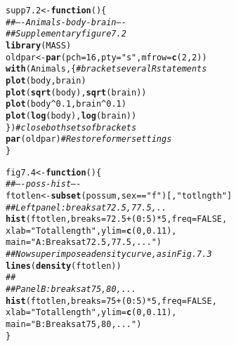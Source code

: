 \documentclass[12pt, a4paper,  BCOR=8.25mm, DIV=15]{scrartcl}\usepackage[]{graphicx}\usepackage[]{color}
\makeatletter
\newcommand{\hlnum}[1]{\textcolor[rgb]{0.686,0.059,0.569}{#1}}%
\newcommand{\hlstr}[1]{\textcolor[rgb]{0.192,0.494,0.8}{#1}}%
\newcommand{\hlcom}[1]{\textcolor[rgb]{0.678,0.584,0.686}{\textit{#1}}}%
\newcommand{\hlopt}[1]{\textcolor[rgb]{0,0,0}{#1}}%
\newcommand{\hlstd}[1]{\textcolor[rgb]{0.345,0.345,0.345}{#1}}%
\newcommand{\hlkwa}[1]{\textcolor[rgb]{0.161,0.373,0.58}{\textbf{#1}}}%
\newcommand{\hlkwb}[1]{\textcolor[rgb]{0.69,0.353,0.396}{#1}}%
\newcommand{\hlkwc}[1]{\textcolor[rgb]{0.333,0.667,0.333}{#1}}%
\newcommand{\hlkwd}[1]{\textcolor[rgb]{0.737,0.353,0.396}{\textbf{#1}}}%
\newenvironment{kframe}{%
 \def\at@end@of@kframe{}%
 \ifinner\ifhmode%
  \def\at@end@of@kframe{\end{minipage}}%
  \begin{minipage}{\columnwidth}%
 \fi\fi%
 \def\FrameCommand##1{\hskip\@totalleftmargin \hskip-\fboxsep
 \colorbox{shadecolor}{##1}\hskip-\fboxsep
     \hskip-\linewidth \hskip-\@totalleftmargin \hskip\columnwidth}%
 \MakeFramed {\advance\hsize-\width
   \@totalleftmargin\z@ \linewidth\hsize
   \@setminipage}}%
 {\par\unskip\endMakeFramed%
 \at@end@of@kframe}
\newenvironment{knitrout}{}{} %
\makeatother
\begin{document}
\begin{knitrout}
\color{fgcolor}\begin{kframe}
\begin{alltt}
\hlstd{supp7.2} \hlkwb{<-} \hlkwa{function}\hlstd{()\{}
\hlcom{## ---- Animals-body-brain ----}
\hlcom{## Supplementary figure 7.2}
\hlkwd{library}\hlstd{(MASS)}
\hlstd{oldpar} \hlkwb{<-} \hlkwd{par}\hlstd{(}\hlkwc{pch}\hlstd{=}\hlnum{16}\hlstd{,} \hlkwc{pty}\hlstd{=}\hlstr{"s"}\hlstd{,} \hlkwc{mfrow}\hlstd{=}\hlkwd{c}\hlstd{(}\hlnum{2}\hlstd{,}\hlnum{2}\hlstd{))}
\hlkwd{with}\hlstd{(Animals, \{}      \hlcom{# bracket several R statements}
  \hlkwd{plot}\hlstd{(body, brain)}
  \hlkwd{plot}\hlstd{(}\hlkwd{sqrt}\hlstd{(body),} \hlkwd{sqrt}\hlstd{(brain))}
  \hlkwd{plot}\hlstd{(body}\hlopt{^}\hlnum{0.1}\hlstd{, brain}\hlopt{^}\hlnum{0.1}\hlstd{)}
  \hlkwd{plot}\hlstd{(}\hlkwd{log}\hlstd{(body),} \hlkwd{log}\hlstd{(brain))}
\hlstd{\})}                   \hlcom{# close both sets of brackets}
\hlkwd{par}\hlstd{(oldpar)}          \hlcom{# Restore former settings}
\hlstd{\}}
\end{alltt}
\end{kframe}
\end{knitrout}

\begin{knitrout}
\color{fgcolor}\begin{kframe}
\begin{alltt}
\hlstd{fig7.4} \hlkwb{<-} \hlkwa{function}\hlstd{()\{}
\hlcom{## ---- poss-hist ----}
\hlstd{ftotlen} \hlkwb{<-} \hlkwd{subset}\hlstd{(possum, sex}\hlopt{==}\hlstr{"f"}\hlstd{)[,} \hlstr{"totlngth"}\hlstd{]}
\hlcom{## Left panel: breaks at 72.5, 77.5,..}
\hlkwd{hist}\hlstd{(ftotlen,} \hlkwc{breaks} \hlstd{=} \hlnum{72.5} \hlopt{+} \hlstd{(}\hlnum{0}\hlopt{:}\hlnum{5}\hlstd{)}\hlopt{*}\hlnum{5}\hlstd{,} \hlkwc{freq}\hlstd{=}\hlnum{FALSE}\hlstd{,}
     \hlkwc{xlab}\hlstd{=}\hlstr{"Total length"}\hlstd{,} \hlkwc{ylim}\hlstd{=}\hlkwd{c}\hlstd{(}\hlnum{0}\hlstd{,}\hlnum{0.11}\hlstd{),}
     \hlkwc{main} \hlstd{=}\hlstr{"A: Breaks at 72.5, 77.5,..."}\hlstd{)}
\hlcom{## Now superimpose a density curve, as in Fig. 7.3}
\hlkwd{lines}\hlstd{(}\hlkwd{density}\hlstd{(ftotlen))}
\hlcom{##}
\hlcom{## Panel B: breaks at 75, 80, ...}
\hlkwd{hist}\hlstd{(ftotlen,} \hlkwc{breaks} \hlstd{=} \hlnum{75} \hlopt{+} \hlstd{(}\hlnum{0}\hlopt{:}\hlnum{5}\hlstd{)}\hlopt{*}\hlnum{5}\hlstd{,} \hlkwc{freq}\hlstd{=}\hlnum{FALSE}\hlstd{,}
     \hlkwc{xlab}\hlstd{=}\hlstr{"Total length"}\hlstd{,} \hlkwc{ylim}\hlstd{=}\hlkwd{c}\hlstd{(}\hlnum{0}\hlstd{,}\hlnum{0.11}\hlstd{),}
     \hlkwc{main}\hlstd{=}\hlstr{"B: Breaks at 75, 80, ..."}\hlstd{)}
\hlstd{\}}
\end{alltt}
\end{kframe}
\end{knitrout}
\end{document}

